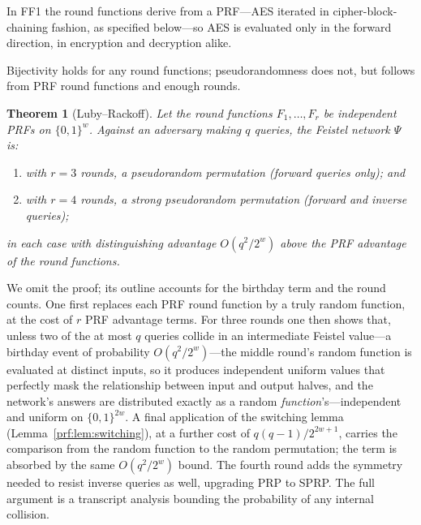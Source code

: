 \documentclass[11pt,a4paper]{article}
\newtheorem{theorem}{Theorem}[section]
\theoremstyle{definition}
\theoremstyle{remark}
\begin{document}
In FF1 the round functions derive from a PRF---AES iterated in
cipher-block-chaining fashion, as specified below---so AES is evaluated
only in the forward direction, in encryption and decryption alike.

Bijectivity holds for any round functions; pseudorandomness does not,
but follows from PRF round functions and enough rounds.

\begin{theorem}[Luby--Rackoff]\label{prf:thm:lubyrackoff}
Let the round functions \(F_{1}, \dots, F_{r}\) be independent PRFs on
\(\{0,1\}^{w}\). Against an adversary making \(q\) queries, the
Feistel network \(\Psi\) is:
\begin{enumerate}
\item with \(r = 3\) rounds, a pseudorandom permutation (forward
  queries only); and
\item with \(r = 4\) rounds, a \emph{strong} pseudorandom permutation
  (forward and inverse queries);
\end{enumerate}
in each case with distinguishing advantage \(O(q^{2}/2^{w})\) above
the PRF advantage of the round functions.
\end{theorem}

We omit the proof; its outline accounts for the birthday term and the
round counts. One first replaces each PRF round function
by a truly random function, at the cost of \(r\) PRF advantage terms.
For three rounds one then shows that, unless two of the at most \(q\)
queries collide in an intermediate Feistel value---a birthday event of
probability \(O(q^{2}/2^{w})\)---the middle round's random function is
evaluated at distinct inputs, so it produces independent uniform
values that perfectly mask the relationship between input and output
halves, and the network's answers are distributed exactly as a random
\emph{function}'s---independent and uniform on \(\{0,1\}^{2w}\). A
final application of the switching lemma
(Lemma~\ref{prf:lem:switching}), at a further cost of
\(q(q-1)/2^{2w+1}\), carries the comparison from the random function
to the random permutation; the term is absorbed by the same
\(O(q^{2}/2^{w})\) bound. The fourth round adds the symmetry needed to resist
inverse queries as well, upgrading PRP to SPRP. The full argument is a
transcript analysis bounding the probability of any internal
collision.
\end{document}
